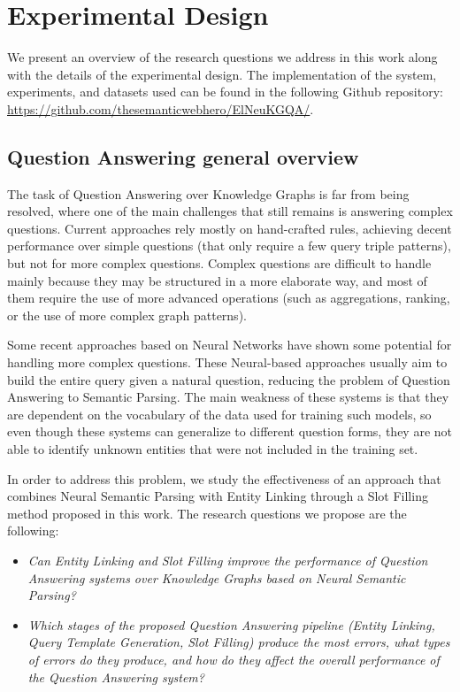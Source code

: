 \chapter{Experimental Design}
\label{cap4:experimentalDesign}
We present an overview of the research questions we address in this work along with 
the details of the experimental design. The implementation of the system, experiments, and 
datasets used can be found in the following Github repository: \url{https://github.com/thesemanticwebhero/ElNeuKGQA/}.

\section{Question Answering general overview}
\label{cap4:experimentalDesign/QaOverview}
The task of Question Answering over Knowledge Graphs is far from being resolved, where one of 
the main challenges that still remains is answering complex questions. Current approaches rely 
mostly on hand-crafted rules, achieving decent performance over simple questions (that only 
require a few query triple patterns), but not for more complex questions. Complex questions are 
difficult to handle mainly because they may be structured in a more elaborate way, and most of 
them require the use of more advanced \SPARQL{} operations (such as aggregations, ranking, or the 
use of more complex graph patterns).

Some recent approaches based on Neural Networks have shown some potential for handling more 
complex questions. These Neural-based approaches usually aim to build the entire \SPARQL{} query 
given a natural question, reducing the problem of Question Answering to Semantic Parsing. The 
main weakness of these systems is that they are dependent on the vocabulary of the data used 
for training such models, so even though these systems can generalize to different question 
forms, they are not able to identify unknown entities that were not included in the training set.

In order to address this problem, we study the effectiveness of an approach that combines Neural 
Semantic Parsing with Entity Linking through a Slot Filling method proposed in this work. The 
research questions we propose are the following:

\begin{itemize}
    \item \textit{Can Entity Linking and Slot Filling improve the performance of Question 
    Answering systems over Knowledge Graphs based on Neural Semantic Parsing?}
    \item \textit{Which stages of the proposed Question Answering pipeline (Entity Linking, 
    Query Template Generation, Slot Filling) produce the most errors, what types of errors do 
    they produce, and how do they affect the overall performance of the Question Answering system?}
\end{itemize}

